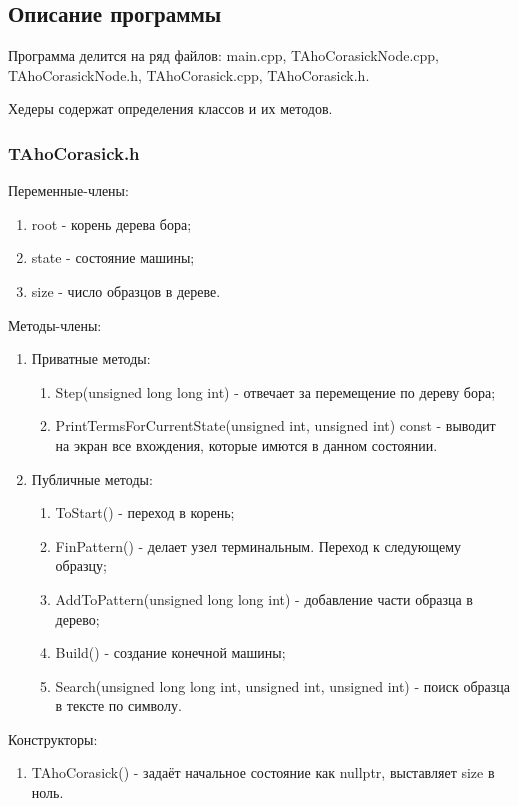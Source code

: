 \documentclass[12pt]{article}
\begin{document}
\subsection*{Описание программы}

Программа делится на ряд файлов: main.cpp, TAhoCorasickNode.cpp, TAhoCorasickNode.h, TAhoCorasick.cpp, TAhoCorasick.h. 

Хедеры содержат определения классов и их методов.

\subsubsection*{TAhoCorasick.h}

Переменные-члены:
\begin{enumerate}
	\item root - корень дерева бора;
	\item state - состояние машины;
	\item size - число образцов в дереве.
\end{enumerate}

Методы-члены:
\begin{enumerate}
	\item Приватные методы:
	\begin{enumerate}
		\item Step(unsigned long long int) - отвечает за перемещение по дереву бора;
		\item PrintTermsForCurrentState(unsigned int, unsigned int) const - выводит на экран все вхождения, которые имются в данном состоянии.
	\end{enumerate}
	\item Публичные методы:
	\begin{enumerate}
		\item ToStart() - переход в корень;
		\item FinPattern() - делает узел терминальным. Переход к следующему образцу;
		\item AddToPattern(unsigned long long int) - добавление части образца в дерево;
		\item Build() - создание конечной машины;
		\item Search(unsigned long long int, unsigned int, unsigned int) - поиск образца в тексте по символу.
	\end{enumerate}
\end{enumerate}


Конструкторы:
\begin{enumerate}
	\item TAhoCorasick() - задаёт начальное состояние как nullptr, выставляет size в ноль.
\end{enumerate}
\end{document}

